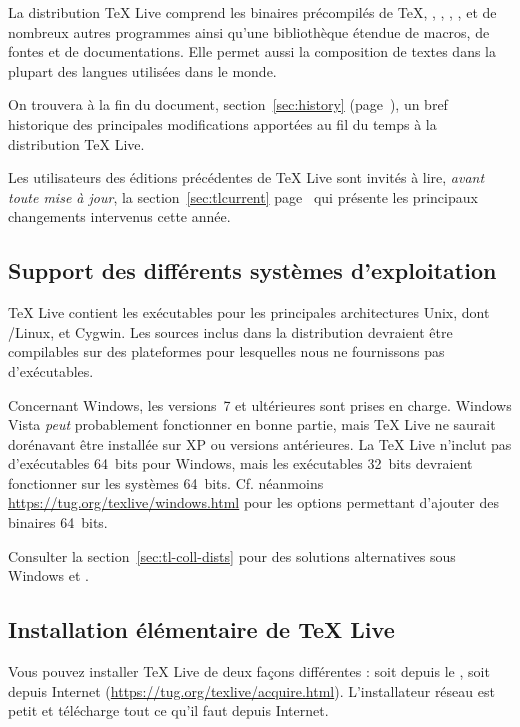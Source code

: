 \documentclass[german, english, french]{article}
\renewcommand{\TL}{\TeX{} Live\xspace}%
\begin{document}
La distribution \TL{} comprend les binaires précompilés de \TeX, \LaTeXe,
\ConTeXt, \MF, \MP, \BibTeX{} et de nombreux autres programmes ainsi qu'une
bibliothèque étendue de macros, de fontes et de documentations. Elle permet
aussi la composition de textes dans la plupart des langues utilisées dans le
monde.

On trouvera à la fin du document, section~\ref{sec:history}
(page~\pageref{sec:history}), un bref historique des principales modifications
apportées au fil du temps à la distribution \TL{}.

Les utilisateurs des éditions précédentes de \TL{} sont invités à lire,
\emph{avant toute mise à jour}, la section~\ref{sec:tlcurrent}
page~\pageref{sec:tlcurrent} qui présente les principaux changements intervenus
cette année.

\subsection{Support des différents systèmes d'exploitation}
\label{sec:os-support}

\TL{} contient les exécutables pour les principales architectures Unix, dont
\GNU/Linux, \MacOSX et Cygwin. Les sources inclus dans la distribution devraient
être compilables sur des plateformes pour lesquelles nous ne fournissons pas
d'exécutables.

Concernant Windows, les versions~7 et ultérieures sont prises en charge.
Windows Vista \emph{peut} probablement fonctionner en bonne partie, mais \TL{} ne
saurait dorénavant être installée sur XP ou versions antérieures.  La \TL{}
n'inclut pas d'exécutables 64~bits pour Windows, mais les exécutables 32~bits
devraient fonctionner sur les systèmes 64~bits. Cf. néanmoins
\url{https://tug.org/texlive/windows.html} pour les options permettant d'ajouter
des binaires 64~bits.

Consulter la section~\ref{sec:tl-coll-dists} pour des solutions alternatives
sous Windows et \MacOSX.

\subsection{Installation élémentaire de \protect\TL{}}
\label{sec:basic}

Vous pouvez installer \TL{} de deux façons différentes : soit depuis le \DVD,
soit depuis Internet (\url{https://tug.org/texlive/acquire.html}).
L'installateur réseau est petit et télécharge tout ce qu'il faut depuis
Internet.
\end{document}
